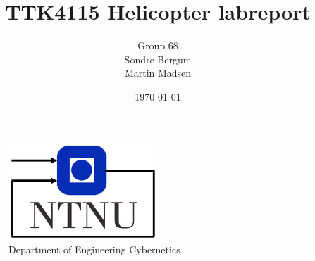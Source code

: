 \documentclass[11pt, a4paper, USenglish]{article} %
\begin{document}
\title{TTK4115 Helicopter labreport}
\author{Group 68\\Sondre Bergum \\Martin Madsen}
\date{\today}
\begin{titlepage}
    \maketitle
    \begin{figure}
    \centering
    \includegraphics[width=0.5\textwidth]{figures/itk_ntnu}\\
    Department of Engineering Cybernetics
    \end{figure}
    \thispagestyle{empty}
\end{titlepage}


\newpage

\thispagestyle{empty} %

\newpage
\tableofcontents
\thispagestyle{empty} %

\newpage
\setcounter{page}{1}










\newpage
{}
\printbibliography{}
\label{sec:bibliography}
\thispagestyle{empty} %
\end{document}

